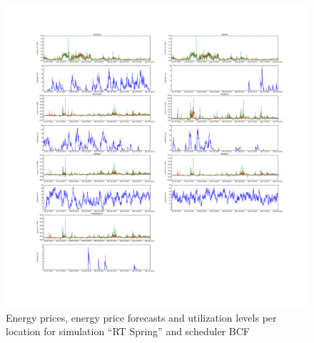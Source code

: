 \begin{figure}[htbp]
	\centering
	\vspace*{-0.6in}
	\hspace*{-1.9in}
		\includegraphics[width=1.60\textwidth]{figures/appendix_simulation_results/RT_Spring_scenario_2.pdf}
	\vspace*{-1.0in}
	\caption{Energy prices, energy price forecasts and utilization levels per location for simulation ``RT Spring'' and scheduler BCF}
	\label{fig:app_RT_Spring_scenario_2}
\end{figure}

